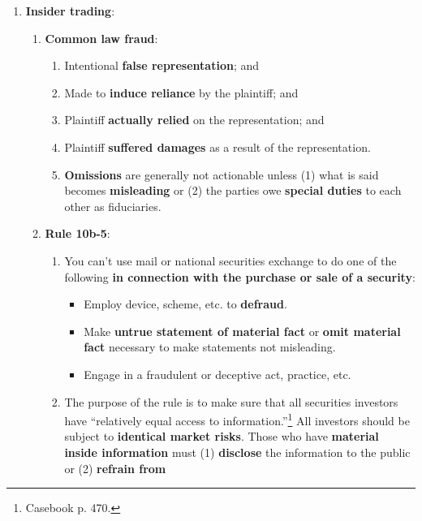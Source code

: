 \begin{enumerate}
\begin{enumerate}
\begin{enumerate}
        \end{enumerate}
    \end{enumerate}
    \item \textbf{Insider trading}:
    \begin{enumerate}
        \item \textbf{Common law fraud}:
        \begin{enumerate}
            \item Intentional \textbf{false representation}; and
            \item Made to \textbf{induce reliance} by the plaintiff; and
            \item Plaintiff \textbf{actually relied} on the representation; 
            and
            \item Plaintiff \textbf{suffered damages} as a result of the 
            representation.
            \item \textbf{Omissions} are generally not actionable unless (1) 
            what is said becomes \textbf{misleading} or (2) the parties owe 
            \textbf{special duties} to each other as fiduciaries.
        \end{enumerate}
        \item \textbf{Rule 10b-5}:
        \begin{enumerate}
            \item You can't use mail or national securities exchange to do one 
            of the following \textbf{in connection with the purchase or sale 
            of a security}:
            \begin{itemize}
                \item Employ device, scheme, etc. to \textbf{defraud}.
                \item Make \textbf{untrue statement of material fact} or 
                \textbf{omit material fact} necessary to make statements not 
                misleading.
                \item Engage in a fraudulent or deceptive act, practice, etc.
            \end{itemize}
            \item The purpose of the rule is to make sure that all securities 
            investors have ``relatively equal access to 
            information.''\footnote{Casebook p. 470.} All investors should be 
            subject to \textbf{identical market risks}. Those who have 
            \textbf{material inside information} must (1) \textbf{disclose} 
            the information to the public or (2) \textbf{refrain from 
}
\end{enumerate}
\end{enumerate}
\end{enumerate}
